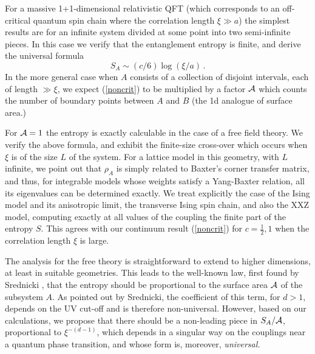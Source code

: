\documentclass[12pt,aps,nofootinbib]{revtex4-1}
\begin{document}
For a massive 1+1-dimensional relativistic QFT (which corresponds to an
off-critical quantum spin chain where the correlation length $\xi\gg a$)
the simplest results are for an infinite system divided at some point
into two semi-infinite pieces.
In this case we verify that
the entanglement entropy is finite, and derive the universal formula
\begin{equation}
\label{noncrit}
S_A\sim (c/6)\log(\xi/a)\,.
\end{equation}
In the more general case when $A$ consists of a collection of disjoint
intervals, each of length $\gg\xi$, we expect (\ref{noncrit}) to be
multiplied by a factor
$\cal A$ which counts the number of boundary points between $A$ and
$B$ (the 1d analogue of surface area.)

For ${\cal A}=1$ the entropy is exactly
calculable in the case of a free field theory. We verify the above
formula, and exhibit the finite-size
cross-over which occurs when $\xi$ is of the size $L$ of the system.
For a lattice model in this geometry, with $L$ infinite, we point out that
$\rho_A$ is simply related to Baxter's corner transfer matrix, and thus,
for integrable models whose weights satisfy a Yang-Baxter relation, all
its eigenvalues can be determined exactly. We treat explicitly the case
of the Ising model and its anisotropic limit, the transverse Ising spin
chain, and also the XXZ model,
computing exactly at all values of the coupling the finite
part of the entropy $S$. This agrees with our continuum result
(\ref{noncrit}) for $c=\frac12,1 $ when the correlation length $\xi$ is large.

The analysis for the free theory is straightforward to extend
to higher dimensions, at least in suitable geometries. This leads to the
well-known law, first found by Srednicki \cite{s-93}, that the
entropy should be proportional to the surface area $\cal A$ of the
subsystem $A$. As pointed out by Srednicki, the coefficient of this term,
for $d>1$, depends on the UV cut-off and is therefore non-universal.
However, based on our calculations, we propose that there should be a
non-leading piece in $S_A/{\cal A}$, proportional to $\xi^{-(d-1)}$,
which depends
in a singular way on the couplings near a quantum phase transition, and
whose form is, moreover, \em universal\em.
\end{document}
